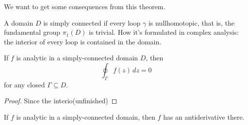 We want to get some consequences from this theorem.
\begin{definition}
    A domain $D$ is simply connected if every loop $\gamma$ is nullhomotopic, that is, the fundamental group $\pi_1(D)$ is trivial. How it's formulated in complex analysis: the interior of every loop is contained in the domain.
\end{definition}
\begin{cor}
    If $f$ is analytic in a simply-connected domain $D$, then \[
        \oint_{\Gamma }^{} f(z) \, dz=0
    \] for any closed $\Gamma \subseteq D$.
\end{cor}
\begin{proof}
    Since the interio(unfinished)
\end{proof}
\begin{cor}
    If $f$ is analytic in a simply-connected domain, then $f$ has an antiderivative there.
\end{cor}


